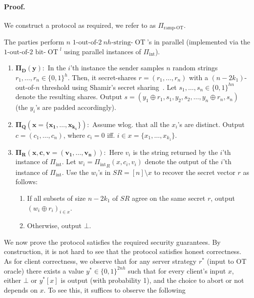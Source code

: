 \documentclass{llncs}
\newcommand{\OT}{\operatorname{OT}}
\newcommand{\bOT}[2]{#1\text{-out-of-}#2\text{ bit-}\OT}
\newcommand{\sOT}[3]{#1\text{-out-of-}#2~#3\text{-string-}\OT}
\newcommand{\INT}{\Pi_{\operatorname{int}}}
\begin{document}
\paragraph{Proof.} We construct a protocol as required, we refer to as $\Pi_{\text{ramp-OT}}$.

\begin{construction}
	The parties perform $n$ $\sOT{1}{2}{nh}$'s in parallel (implemented via the ${\bOT{1}{2}}^l$ using parallel instances of $\INT$).  
		\begin{enumerate} 
			\item $\mathbf{\Pi_D(y):}$ In the $i$'th instance the sender samples $n$ random strings $r_1,\ldots,r_n\in\{0,1\}^h$. Then, it secret-shares $r=(r_1,\ldots,r_n)$ with a $(n-2k_1)$-out-of-$n$ threshold using Shamir's secret sharing~\cite{Shamir79}. Let $s_1,\ldots,s_n\in \{0,1\}^{hn}$ denote the resulting shares. Output $s = (y_1\oplus r_1,s_1,y_2,s_2,\ldots,y_n\oplus r_n,s_n)$ (the $y_i$'s are padded accordingly).
			\item $\mathbf{\Pi_Q(x=\{x_1,\ldots,x_{k_1}\}):}$ Assume wlog. that all the $x_i$'s are distinct. Output $c=(c_1,\ldots,c_n)$, where $c_i=0$ iff. $i\in x = \{x_1,\ldots,x_{k_1}\}$.
			\item $\mathbf{\Pi_R(x,c,v=(v_1,\ldots,v_n)):}$ Here $v_i$ is the string returned by the $i$'th instance of $\INT$.
			Let $w_i = {\INT}_R(x,c_i,v_i)$ denote the output of the $i$'th instance of $\INT$. Use the $w_i$'s in $SR=[n]\setminus{x}$ to recover the secret vector $r$ as follows:
		\begin{enumerate}
		 \item If all subsets of size $n-2k_1$ of $SR$ agree on the same secret $r$, output $(w_i\oplus r_i)_{i\in x}$. 
		 \item Otherwise, output $\bot$.   
		\end{enumerate}
	\end{enumerate}
\end{construction}


We now prove the protocol satisfies the required security guarantees.
By construction, it is not hard to see that the protocol satisfies honest correctness. As for client correctness, we observe that for any server strategy $r^*$ (input to OT oracle) there exists a value $y^*\in\{0,1\}^{2nh}$ such that for every client's input $x$, 
either $\bot$ or $y^*[x]$ is output (with probability 1), and the choice to abort or not depends on $x$. To see this, it suffices to observe the following
\end{document}
